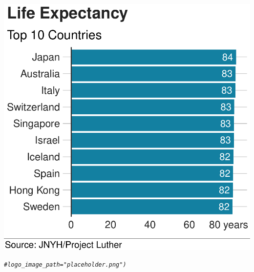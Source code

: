 \documentclass{article}\usepackage[]{graphicx}\usepackage[]{color}
\makeatletter
\newcommand{\hlcom}[1]{\textcolor[rgb]{0.678,0.584,0.686}{\textit{#1}}}%
\newenvironment{kframe}{%
 \def\at@end@of@kframe{}%
 \ifinner\ifhmode%
  \def\at@end@of@kframe{\end{minipage}}%
  \begin{minipage}{\columnwidth}%
 \fi\fi%
 \def\FrameCommand##1{\hskip\@totalleftmargin \hskip-\fboxsep
 \colorbox{shadecolor}{##1}\hskip-\fboxsep
     \hskip-\linewidth \hskip-\@totalleftmargin \hskip\columnwidth}%
 \MakeFramed {\advance\hsize-\width
   \@totalleftmargin\z@ \linewidth\hsize
   \@setminipage}}%
 {\par\unskip\endMakeFramed%
 \at@end@of@kframe}
\newenvironment{knitrout}{}{} %
\makeatother
\begin{document}
\begin{knitrout}
{\centering \includegraphics[width=.6\linewidth]{figure/Analysis-Rnwauto-report-1} 

}


\begin{kframe}\begin{alltt}
              \hlcom{#logo_image_path = "placeholder.png")}


\end{alltt}
\end{kframe}
\end{knitrout}
\end{document}
